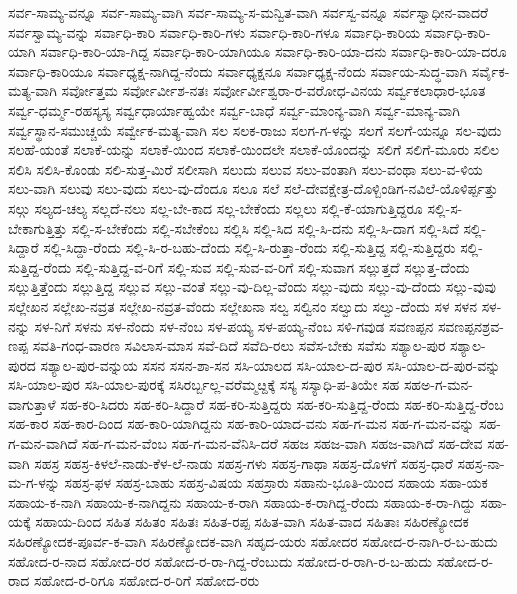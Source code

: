 ಸರ್ವ-ಸಾಮ್ಯ-ವನ್ನೂ
ಸರ್ವ-ಸಾಮ್ಯ-ವಾಗಿ
ಸರ್ವ-ಸಾಮ್ಯ-ಸ-ಮನ್ವಿತ-ವಾಗಿ
ಸರ್ವಸ್ವ-ವನ್ನೂ
ಸರ್ವಸ್ವಾಧೀನ-ವಾದರೆ
ಸರ್ವಸ್ವಾಮ್ಯ-ವನ್ನು
ಸರ್ವಾಧಿ-ಕಾರಿ
ಸರ್ವಾಧಿ-ಕಾರಿ-ಗಳು
ಸರ್ವಾಧಿ-ಕಾರಿ-ಗಳೂ
ಸರ್ವಾಧಿ-ಕಾರಿಯ
ಸರ್ವಾಧಿ-ಕಾರಿ-ಯಾಗಿ
ಸರ್ವಾಧಿ-ಕಾರಿ-ಯಾ-ಗಿದ್ದ
ಸರ್ವಾಧಿ-ಕಾರಿ-ಯಾಗಿಯೂ
ಸರ್ವಾಧಿ-ಕಾರಿ-ಯಾ-ದನು
ಸರ್ವಾಧಿ-ಕಾರಿ-ಯಾ-ದರೂ
ಸರ್ವಾಧಿ-ಕಾರಿಯೂ
ಸರ್ವಾಧ್ಯಕ್ಷ-ನಾಗಿದ್ದ-ನೆಂದು
ಸರ್ವಾಧ್ಯಕ್ಷನೂ
ಸರ್ವಾಧ್ಯಕ್ಷ-ನೆಂದು
ಸರ್ವಾಯ-ಸುದ್ಧ-ವಾಗಿ
ಸರ್ವೈಕ-ಮತ್ಯ-ವಾಗಿ
ಸರ್ವೋತ್ತಮ
ಸರ್ವೋರ್ವೀಶ-ನತಃ
ಸರ್ವೋರ್ವೀಶ್ವರಾ-ರ-ವರೋಧ-ವಿನಯ
ಸರ್ವ್ವಕಲಾಧಾರ-ಭೂತ
ಸರ್ವ್ವ-ಧರ್ಮ್ಮ-ರಹಸ್ಯಸ್ಯ
ಸರ್ವ್ವಧಾರ್ಯಾಹ್ವಯೇ
ಸರ್ವ್ವ-ಬಾಧೆ
ಸರ್ವ್ವ-ಮಾಂನ್ಯ-ವಾಗಿ
ಸರ್ವ್ವ-ಮಾನ್ಯ-ವಾಗಿ
ಸರ್ವ್ವಸ್ಥಾನ-ಸಮುಚ್ಚಯೆ
ಸರ್ವ್ವೇಕ-ಮತ್ಯ-ವಾಗಿ
ಸಲ
ಸಲಕ-ರಾಜು
ಸಲಗ-ಗ-ಳನ್ನು
ಸಲಗೆ
ಸಲಗೆ-ಯನ್ನೂ
ಸಲ-ವುದು
ಸಲಹೆ-ಯಂತೆ
ಸಲಾಕೆ-ಯನ್ನು
ಸಲಾಕೆ-ಯಿಂದ
ಸಲಾಕೆ-ಯಿಂದಲೇ
ಸಲಾಕೆ-ಯೊಂದನ್ನು
ಸಲಿಗೆ
ಸಲಿಗೆ-ಮೂರು
ಸಲಿಲ
ಸಲಿಸಿ
ಸಲಿಸಿ-ಕೊಂಡು
ಸಲಿ-ಸುತ್ತ-ಮಿರೆ
ಸಲೀಸಾಗಿ
ಸಲುದು
ಸಲುವ
ಸಲು-ವಂತಾಗಿ
ಸಲು-ವಂಥಾ
ಸಲು-ವ-ಳಿಯ
ಸಲು-ವಾಗಿ
ಸಲುವು
ಸಲು-ವುದು
ಸಲು-ವು-ದೆಂದೂ
ಸಲೂ
ಸಲೆ
ಸಲೆ-ದೇವಕ್ಷೇತ್ರ-ದೊಳ್ಬಿಂಡಿಗ-ನವಿಲೆ-ಯೊಳಿರ್ಪ್ಪತ್ತು
ಸಲ್ಗು
ಸಲ್ಯದ-ಚಲ್ಯ
ಸಲ್ಲದೆ-ನಲು
ಸಲ್ಲ-ಬೇ-ಕಾದ
ಸಲ್ಲ-ಬೇಕೆಂದು
ಸಲ್ಲಲು
ಸಲ್ಲಿ-ಕೆ-ಯಾಗುತ್ತಿದ್ದರೂ
ಸಲ್ಲಿ-ಸ-ಬೇಕಾಗುತ್ತಿತ್ತು
ಸಲ್ಲಿ-ಸ-ಬೇಕೆಂದು
ಸಲ್ಲಿ-ಸಬೇಕೆಂಬ
ಸಲ್ಲಿಸಿ
ಸಲ್ಲಿ-ಸಿದ
ಸಲ್ಲಿ-ಸಿ-ದನು
ಸಲ್ಲಿ-ಸಿ-ದಾಗ
ಸಲ್ಲಿ-ಸಿದೆ
ಸಲ್ಲಿ-ಸಿದ್ದಾರೆ
ಸಲ್ಲಿ-ಸಿದ್ದಾ-ರೆಂದು
ಸಲ್ಲಿ-ಸಿ-ರ-ಬಹು-ದೆಂದು
ಸಲ್ಲಿ-ಸಿ-ರುತ್ತಾ-ರೆಂದು
ಸಲ್ಲಿ-ಸುತ್ತಿದ್ದ
ಸಲ್ಲಿ-ಸುತ್ತಿದ್ದರು
ಸಲ್ಲಿ-ಸುತ್ತಿದ್ದ-ರೆಂದು
ಸಲ್ಲಿ-ಸುತ್ತಿದ್ದ-ವ-ರಿಗೆ
ಸಲ್ಲಿ-ಸುವ
ಸಲ್ಲಿ-ಸುವ-ವ-ರಿಗೆ
ಸಲ್ಲಿ-ಸುವಾಗ
ಸಲ್ಲುತ್ತದೆ
ಸಲ್ಲುತ್ತ-ದೆಂದು
ಸಲ್ಲುತ್ತಿತ್ತೆಂದು
ಸಲ್ಲುತ್ತಿದ್ದ
ಸಲ್ಲುವ
ಸಲ್ಲು-ವಂತೆ
ಸಲ್ಲು-ವು-ದಿಲ್ಲ-ವೆಂದು
ಸಲ್ಲು-ವುದು
ಸಲ್ಲು-ವು-ದೆಂದು
ಸಲ್ಲು-ವುವು
ಸಲ್ಲೇಖನ
ಸಲ್ಲೇಖ-ನವ್ರತ
ಸಲ್ಲೇಖ-ನವ್ರತ-ವೆಂದು
ಸಲ್ಲೇಖನಾ
ಸಲ್ವ
ಸಲ್ವಿನಂ
ಸಲ್ವುದು
ಸಲ್ವು-ದೆಂದು
ಸಳ
ಸಳನ
ಸಳ-ನನ್ನು
ಸಳ-ನಿಗೆ
ಸಳನು
ಸಳ-ನೆಂದು
ಸಳ-ನೆಂಬ
ಸಳ-ಪಯ್ಯ
ಸಳ-ಪಯ್ಯ-ನೆಂಬ
ಸಳಿ-ಗವುಡ
ಸವಣಪ್ಪನ
ಸವಣಪ್ಪನಶ್ರವ-ಣಪ್ಪ
ಸವತಿ-ಗಂಧ-ವಾರಣ
ಸವಿಲಾಸ-ಮಾಸ
ಸವೆ-ದಿದೆ
ಸವೆದಿ-ರಲು
ಸವೆಸ-ಬೇಕು
ಸವೆಸು
ಸಶ್ಯಾಲ-ಪುರ
ಸಶ್ಯಾಲ-ಪುರದ
ಸಶ್ಯಾಲ-ಪುರ-ವನ್ನುಯ
ಸಸನ
ಸಸನ-ಶಾ-ಸನ
ಸಸಿ-ಯಾಲದ
ಸಸಿ-ಯಾಲ-ದ-ಪುರ
ಸಸಿ-ಯಾಲ-ದ-ಪುರ-ವನ್ನು
ಸಸಿ-ಯಾಲ-ಪುರ
ಸಸಿ-ಯಾಲ-ಪುರಕ್ಕೆ
ಸಸಿರರ್ಬ್ಬಲ್ಲ-ವರೆಮ್ಮೞ್ದಕ್ಕೆ
ಸಸ್ಯ
ಸಸ್ಯಾಧಿ-ಪ-ತಿಯೇ
ಸಹ
ಸಹಅ-ಗ-ಮನ-ವಾಗುತ್ತಾಳೆ
ಸಹ-ಕರಿ-ಸಿದರು
ಸಹ-ಕರಿ-ಸಿದ್ದಾರೆ
ಸಹ-ಕರಿ-ಸುತ್ತಿದ್ದರು
ಸಹ-ಕರಿ-ಸುತ್ತಿದ್ದ-ರೆಂದು
ಸಹ-ಕರಿ-ಸುತ್ತಿದ್ದ-ರೆಂಬ
ಸಹ-ಕಾರ
ಸಹ-ಕಾರ-ದಿಂದ
ಸಹ-ಕಾರಿ-ಯಾಗಿದ್ದನು
ಸಹ-ಕಾರಿ-ಯಾದ-ವನು
ಸಹ-ಗ-ಮನ
ಸಹ-ಗ-ಮನ-ವನ್ನು
ಸಹ-ಗ-ಮನ-ವಾಗಿದೆ
ಸಹ-ಗ-ಮನ-ವೆಂಬ
ಸಹ-ಗ-ಮನ-ವೆನಿಸಿ-ದರೆ
ಸಹಜ
ಸಹಜ-ವಾಗಿ
ಸಹಜ-ವಾಗಿದೆ
ಸಹ-ದೇವ
ಸಹ-ವಾಗಿ
ಸಹಸ್ರ
ಸಹಸ್ರ-ಕಿಳಲೆ-ನಾಡು-ಕೆಳ-ಲೆ-ನಾಡು
ಸಹಸ್ರ-ಗಳು
ಸಹಸ್ರ-ಗಾಥಾ
ಸಹಸ್ರ-ದೊಳಗೆ
ಸಹಸ್ರ-ಧಾರೆ
ಸಹಸ್ರ-ನಾ-ಮ-ಗ-ಳನ್ನು
ಸಹಸ್ರ-ಫಳ
ಸಹಸ್ರ-ಬಾಹು
ಸಹಸ್ರ-ವಿಷಯ
ಸಹಸ್ರಾರು
ಸಹಾನು-ಭೂತಿ-ಯಿಂದ
ಸಹಾಯ
ಸಹಾ-ಯಕ
ಸಹಾಯ-ಕ-ನಾಗಿ
ಸಹಾಯ-ಕ-ನಾಗಿದ್ದನು
ಸಹಾಯ-ಕ-ರಾಗಿ
ಸಹಾಯ-ಕ-ರಾಗಿದ್ದ-ರೆಂದು
ಸಹಾಯ-ಕ-ರಾ-ಗಿದ್ದು
ಸಹಾ-ಯಕ್ಕೆ
ಸಹಾಯ-ದಿಂದ
ಸಹಿತ
ಸಹಿತಂ
ಸಹಿತಃ
ಸಹಿತ-ರಪ್ಪ
ಸಹಿತ-ವಾಗಿ
ಸಹಿತ-ವಾದ
ಸಹಿತಾಃ
ಸಹಿರಣ್ಯೋದಕ
ಸಹಿರಣ್ಯೋದಕ-ಪೂರ್ವ-ಕ-ವಾಗಿ
ಸಹಿರಣ್ಯೋದಕ-ವಾಗಿ
ಸಹೃದ-ಯರು
ಸಹೋದರ
ಸಹೋದ-ರ-ನಾಗಿ-ರ-ಬ-ಹುದು
ಸಹೋದ-ರ-ನಾದ
ಸಹೋದ-ರರ
ಸಹೋದ-ರ-ರಾ-ಗಿದ್ದ-ರೆಂಬುದು
ಸಹೋದ-ರ-ರಾಗಿ-ರ-ಬ-ಹುದು
ಸಹೋದ-ರ-ರಾದ
ಸಹೋದ-ರ-ರಿಗೂ
ಸಹೋದ-ರ-ರಿಗೆ
ಸಹೋದ-ರರು
